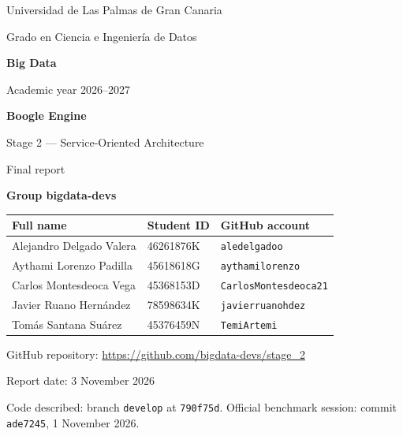 \documentclass[10pt,a4paper]{article}
\renewcommand{\arraystretch}{1.2}
\newcommand{\coursename}{Big Data}
\newcommand{\degreename}{Grado en Ciencia e Ingeniería de Datos}
\newcommand{\universityname}{Universidad de Las Palmas de Gran Canaria}
\newcommand{\academicyear}{2026--2027}
\newcommand{\projecttitle}{Boogle Engine}
\newcommand{\groupname}{bigdata-devs}
\newcommand{\repourl}{https://github.com/bigdata-devs/stage_2}
\newcommand{\memberAname}{Alejandro Delgado Valera}\newcommand{\memberAid}{46261876K}\newcommand{\memberAgit}{aledelgadoo}
\newcommand{\memberBname}{Aythami Lorenzo Padilla}\newcommand{\memberBid}{45618618G}\newcommand{\memberBgit}{aythamilorenzo}
\newcommand{\memberCname}{Carlos Montesdeoca Vega}\newcommand{\memberCid}{45368153D}\newcommand{\memberCgit}{CarlosMontesdeoca21}
\newcommand{\memberDname}{Javier Ruano Hernández}\newcommand{\memberDid}{78598634K}\newcommand{\memberDgit}{javierruanohdez}
\newcommand{\memberEname}{Tomás Santana Suárez}\newcommand{\memberEid}{45376459N}\newcommand{\memberEgit}{TemiArtemi}
\begin{document}
\begin{titlepage}
  \thispagestyle{empty}
  \centering
  {\large \universityname\par}
  \vspace{0.15cm}
  {\normalsize \degreename\par}
  \vspace{1.1cm}
  {\Large\bfseries \coursename\par}
  \vspace{0.15cm}
  {\normalsize Academic year \academicyear\par}

  \vspace{2.4cm}
  {\fontsize{36}{42}\selectfont\bfseries \projecttitle\par}
  \vspace{0.45cm}
  {\Large Stage 2 --- Service-Oriented Architecture\par}
  \vspace{0.2cm}
  {\large Final report\par}

  \vspace{2.0cm}
  {\normalsize\bfseries Group \groupname\par}
  \vspace{0.35cm}
  \renewcommand{\arraystretch}{1.25}
  \begin{tabular}{@{}lll@{}}
    \toprule
    Full name & Student ID & GitHub account \\
    \midrule
    \memberAname & \memberAid & \texttt{\memberAgit} \\
    \memberBname & \memberBid & \texttt{\memberBgit} \\
    \memberCname & \memberCid & \texttt{\memberCgit} \\
    \memberDname & \memberDid & \texttt{\memberDgit} \\
    \memberEname & \memberEid & \texttt{\memberEgit} \\
    \bottomrule
  \end{tabular}

  \vspace{1.1cm}
  {\normalsize GitHub repository: \url{\repourl}\par}

  \vfill
  {\small
   Report date: 3 November 2026\par
   Code described: branch \texttt{develop} at \texttt{790f75d}.
   Official benchmark session: commit \texttt{ade7245}, 1 November 2026.\par}
\end{titlepage}
\end{document}
